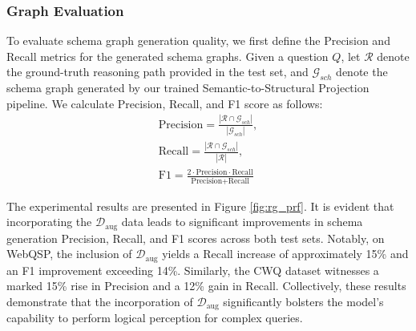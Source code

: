 \documentclass[11pt]{article}
\begin{document}
\subsubsection{Graph Evaluation}
To evaluate schema graph generation quality, we first define the Precision and Recall metrics for the generated schema graphs. Given a question $Q$, let $\mathcal{R}$ denote the ground-truth reasoning path provided in the test set, and $\mathcal{G}_{sch}$ denote the schema graph generated by our trained Semantic-to-Structural Projection pipeline. We calculate Precision, Recall, and F1 score as follows:
\begin{gather}
\text{Precision} = \frac{|\mathcal{R} \cap \mathcal{G}_{sch}|}{|\mathcal{G}_{sch}|}, \\
\text{Recall} = \frac{|\mathcal{R} \cap \mathcal{G}_{sch}|}{|\mathcal{R}|}, \\
\text{F1} = \frac{2 \cdot \text{Precision} \cdot \text{Recall}}{\text{Precision} + \text{Recall}}
\end{gather}

The experimental results are presented in Figure \ref{fig:rg_prf}. It is evident that incorporating the $\mathcal{D}_\text{aug}$ data leads to significant improvements in schema generation Precision, Recall, and F1 scores across both test sets. Notably, on WebQSP, the inclusion of $\mathcal{D}_\text{aug}$ yields a Recall increase of approximately 15\% and an F1 improvement exceeding 14\%. Similarly, the CWQ dataset witnesses a marked 15\% rise in Precision and a 12\% gain in Recall. Collectively, these results demonstrate that the incorporation of $\mathcal{D}_\text{aug}$ significantly bolsters the model's capability to perform logical perception for complex queries.
\end{document}
